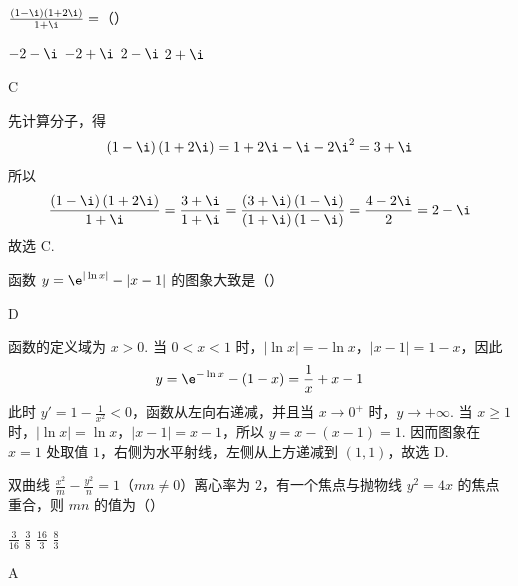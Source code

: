 \begin{problem}
\(\frac{\left(1 - \i\right)\left(1 + 2\i\right)}{1 + \i} =\)（\quad）

\choices
    {\(-2 - \i\)}
    {\(-2 + \i\)}
    {\(2 - \i\)}
    {\(2 + \i\)}
\end{problem}

\begin{answer}
C
\end{answer}

\begin{solution}
先计算分子，得
\[
\left(1-\i\right)\left(1+2\i\right)=1+2\i-\i-2\i^2=3+\i
\]
所以
\[
\frac{\left(1-\i\right)\left(1+2\i\right)}{1+\i}=\frac{3+\i}{1+\i}=\frac{\left(3+\i\right)\left(1-\i\right)}{\left(1+\i\right)\left(1-\i\right)}=\frac{4-2\i}{2}=2-\i
\]
故选 C.
\end{solution}

\begin{problem}
函数 \( y = \e^{|\ln x|} - |x - 1| \) 的图象大致是（\quad）

    {}
    {}
    {}
\end{problem}

\begin{answer}
D
\end{answer}

\begin{solution}
函数的定义域为 \(x>0\). 当 \(0<x<1\) 时，\(|\ln x|=-\ln x\)，\(|x-1|=1-x\)，因此
\[
y=\e^{-\ln x}-(1-x)=\frac{1}{x}+x-1
\]
此时 \(y'=1-\frac{1}{x^2}<0\)，函数从左向右递减，并且当 \(x\to0^+\) 时，\(y\to+\infty\). 当 \(x\geqslant1\) 时，\(|\ln x|=\ln x\)，\(|x-1|=x-1\)，所以 \(y=x-(x-1)=1\). 因而图象在 \(x=1\) 处取值 \(1\)，右侧为水平射线，左侧从上方递减到 \((1,1)\)，故选 D.
\end{solution}

\begin{problem}
双曲线 \(\frac{x^2}{m} - \frac{y^2}{n} = 1\)（\(mn \neq 0\)）离心率为 \(2\)，有一个焦点与抛物线 \(y^2 = 4x\) 的焦点重合，则 \(mn\) 的值为（\quad）

\choices
    {\( \frac{3}{16} \)}
    {\( \frac{3}{8} \)}
    {\( \frac{16}{3} \)}
    {\( \frac{8}{3} \)}
\end{problem}

\begin{answer}
A
\end{answer}

